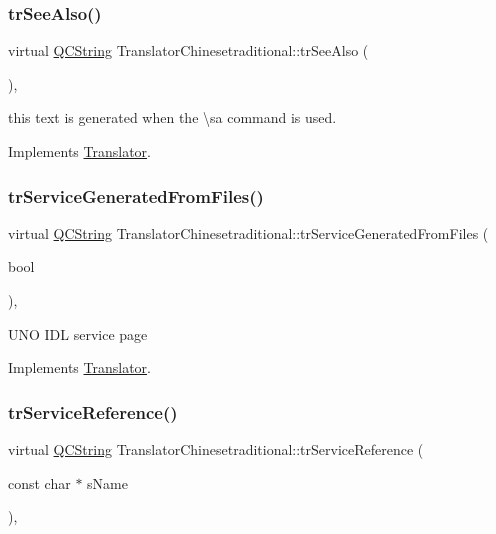 \subsubsection{\texorpdfstring{trSeeAlso()}{trSeeAlso()}}
{\footnotesize\ttfamily virtual \mbox{\hyperlink{class_q_c_string}{Q\+C\+String}} Translator\+Chinesetraditional\+::tr\+See\+Also (\begin{DoxyParamCaption}{ }\end{DoxyParamCaption})\hspace{0.3cm}{\ttfamily [inline]}, {\ttfamily [virtual]}}

this text is generated when the \textbackslash{}sa command is used. 

Implements \mbox{\hyperlink{class_translator}{Translator}}.

\mbox{\label{class_translator_chinesetraditional_aa04c12d76779e28486e8a64f2bb4cd56}} 
\subsubsection{\texorpdfstring{trServiceGeneratedFromFiles()}{trServiceGeneratedFromFiles()}}
{\footnotesize\ttfamily virtual \mbox{\hyperlink{class_q_c_string}{Q\+C\+String}} Translator\+Chinesetraditional\+::tr\+Service\+Generated\+From\+Files (\begin{DoxyParamCaption}\item[{bool}]{ }\end{DoxyParamCaption})\hspace{0.3cm}{\ttfamily [inline]}, {\ttfamily [virtual]}}

U\+NO I\+DL service page 

Implements \mbox{\hyperlink{class_translator}{Translator}}.

\mbox{\label{class_translator_chinesetraditional_ad3ce43e1363103ca2a4a6197810175f2}} 
\subsubsection{\texorpdfstring{trServiceReference()}{trServiceReference()}}
{\footnotesize\ttfamily virtual \mbox{\hyperlink{class_q_c_string}{Q\+C\+String}} Translator\+Chinesetraditional\+::tr\+Service\+Reference (\begin{DoxyParamCaption}\item[{const char $\ast$}]{s\+Name }\end{DoxyParamCaption})\hspace{0.3cm}{\ttfamily [inline]}, {\ttfamily [virtual]}}

